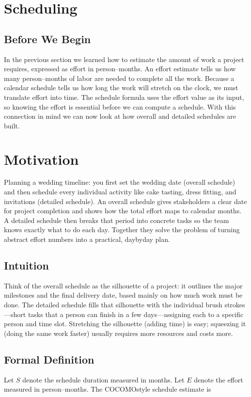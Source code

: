 \documentclass[12pt, a4paper]{article}
\begin{document}
\section{Scheduling}
\subsection{Before We Begin}
In the previous section we learned how to estimate the amount of work a project requires, expressed as effort in person--months.  An effort estimate tells us how many person--months of labor are needed to complete all the work.  Because a calendar schedule tells us how long the work will stretch on the clock, we must translate effort into time.  The schedule formula uses the effort value as its input, so knowing the effort is essential before we can compute a schedule.  With this connection in mind we can now look at how overall and detailed schedules are built.

\section{Motivation}
Planning a wedding timeline: you first set the wedding date (overall schedule) and then schedule every individual activity like cake tasting, dress fitting, and invitations (detailed schedule).  An overall schedule gives stakeholders a clear date for project completion and shows how the total effort maps to calendar months.  A detailed schedule then breaks that period into concrete tasks so the team knows exactly what to do each day.  Together they solve the problem of turning abstract effort numbers into a practical, daybyday plan.

\subsection{Intuition}
Think of the overall schedule as the silhouette of a project: it outlines the major milestones and the final delivery date, based mainly on how much work must be done.  The detailed schedule fills that silhouette with the individual brush strokes---short tasks that a person can finish in a few days---assigning each to a specific person and time slot.  Stretching the silhouette (adding time) is easy; squeezing it (doing the same work faster) usually requires more resources and costs more.

\subsection{Formal Definition}
Let \(S\) denote the schedule duration measured in months.  Let \(E\) denote the effort measured in person--months.  The COCOMOstyle schedule estimate is  
\end{document}
